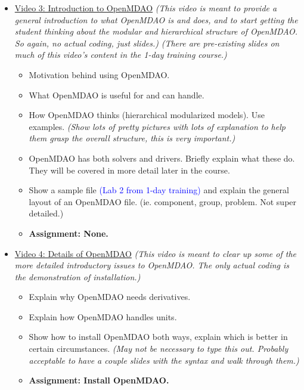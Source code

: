 \documentclass[12pt, letterpaper]{article}
\begin{document}
\begin{itemize}
	\item \underline{Video 3: Introduction to OpenMDAO} \textit{(This video is meant to provide a general introduction to what OpenMDAO is and does, and to start getting the student thinking about the modular and hierarchical structure of OpenMDAO. So again, no actual coding, just slides.)} \textit{(There are pre-existing slides on much of this video's content in the 1-day training course.)}
		\begin{itemize}
			\item Motivation behind using OpenMDAO.
			\item What OpenMDAO is useful for and can handle.
			\item How OpenMDAO thinks (hierarchical modularized models). Use examples. \textit{(Show lots of pretty pictures with lots of explanation to help them grasp the overall structure, this is very important.)}
			\item OpenMDAO has both solvers and drivers. Briefly explain what these do. They will be covered in more detail later in the course.
			\item Show a sample file \textcolor{blue}{(Lab 2 from 1-day training)} and explain the general layout of an OpenMDAO file. (ie. component, group, problem. Not super detailed.)
			\item \textbf{Assignment: None.}
		\end{itemize}

	\item \underline{Video 4: Details of OpenMDAO} \textit{(This video is meant to clear up some of the more detailed introductory issues to OpenMDAO. The only actual coding is the demonstration of installation.)}
		\begin{itemize}
			\item Explain why OpenMDAO needs derivatives.
			\item Explain how OpenMDAO handles units.
			\item Show how to install OpenMDAO both ways, explain which is better in certain circumstances. \textit{(May not be necessary to type this out. Probably acceptable to have a couple slides with the syntax and walk through them.)}
			\item \textbf{Assignment: Install OpenMDAO.}
		\end{itemize}


\end{itemize}
\end{document}
